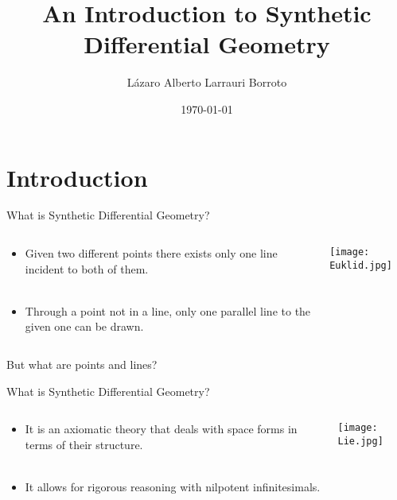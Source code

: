 \documentclass[handout, 11pt]{beamer}
\title[An Introduction to Synthetic Differential Geometry]{An Introduction to Synthetic Differential Geometry}
\author[Differential Geometry]{Lázaro Alberto Larrauri Borroto}
\date\today
\begin{document}
	\frame{\titlepage}
	\frame{\tableofcontents}
	
	
	
	
\section{Introduction}
\begin{frame}{What is Synthetic Differential Geometry?}
		\begin{columns}
			\begin{column}{0.55\textwidth}
				\begin{itemize}
					\item Given two different points there exists only one line incident to both
					of them.
					\\ ~\\
					\item Through a point not in a line, only one parallel line to the given one can be drawn. 
				
				\end{itemize}
			\end{column}
			\begin{column}{0.45\textwidth}  %
				\begin{center}
					\texttt{[image: Euklid.jpg]}
				\end{center}
			\end{column}
		\end{columns}
		\begin{center}
			But what are points and lines?
		\end{center}	
\end{frame}

\begin{frame}{What is Synthetic Differential Geometry?}
	\begin{columns}
		\begin{column}{0.55\textwidth}
			\begin{itemize}
				\item It is an axiomatic theory that deals with space forms in terms of their structure.
				\\~\\
				\item It allows for rigorous reasoning with nilpotent infinitesimals.
			\end{itemize}
		\end{column}
		\begin{column}{0.45\textwidth}
			\begin{center}				
				\texttt{[image: Lie.jpg]}
			\end{center}
		\end{column}
	\end{columns}
\end{frame}
\end{document}

